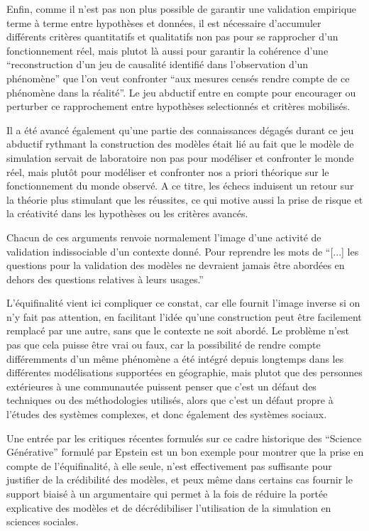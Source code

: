 Enfin, comme il n'est pas non plus possible de garantir une validation empirique terme à terme entre hypothèses et données, il est nécessaire d'accumuler différents critères quantitatifs et qualitatifs non pas pour se rapprocher d'un fonctionnement réel, mais plutot là aussi pour garantir la cohérence d'une \enquote{reconstruction d'un jeu de causalité identifié dans l'observation d'un phénomène} que l'on veut confronter \enquote{aux mesures censés rendre compte de ce phénomène dans la réalité}. Le jeu abductif entre en compte pour encourager ou perturber ce rapprochement entre hypothèses selectionnés et critères mobilisés.

Il a été avancé également qu'une partie des connaissances dégagés durant ce jeu abductif rythmant la construction des modèles était lié au fait que le modèle de simulation servait de laboratoire non pas pour modéliser et confronter le monde réel, mais plutôt pour modéliser et confronter nos a priori théorique sur le fonctionnement du monde observé. A ce titre, les échecs induisent un retour sur la théorie plus stimulant que les réussites, ce qui motive aussi la prise de risque et la créativité dans les hypothèses ou les critères avancés.


Chacun de ces arguments renvoie normalement l'image d'une activité de validation indissociable d'un contexte donné. Pour reprendre les mots de \textcite{Amblard2006} \enquote{[...] les questions pour la validation des modèles ne devraient jamais être abordées en dehors des questions relatives à leurs usages.} 

L'équifinalité vient ici compliquer ce constat, car elle fournit l'image inverse si on n'y fait pas attention, en facilitant l'idée qu'une construction peut être facilement remplacé par une autre, sans que le contexte ne soit abordé. Le problème n'est pas que cela puisse être vrai ou faux, car la possibilité de rendre compte différemments d'un même phénomène a été intégré depuis longtemps dans les différentes modélisations supportées en géographie, mais plutot que des personnes extérieures à une communautée puissent penser que c'est un défaut des techniques ou des méthodologies utilisés, alors que c'est un défaut propre à l'études des systèmes complexes, et donc également des systèmes sociaux. 


Une entrée par les critiques récentes formulés sur ce cadre historique des \enquote{Science Générative} formulé par Epstein est un bon exemple pour montrer que la prise en compte de l'équifinalité, à elle seule, n'est effectivement pas suffisante pour justifier de la crédibilité des modèles, et peux même dans certains cas fournir le support biaisé à un argumentaire qui permet à la fois de réduire la portée explicative des modèles et de décrédibiliser l'utilisation de la simulation en sciences sociales.

